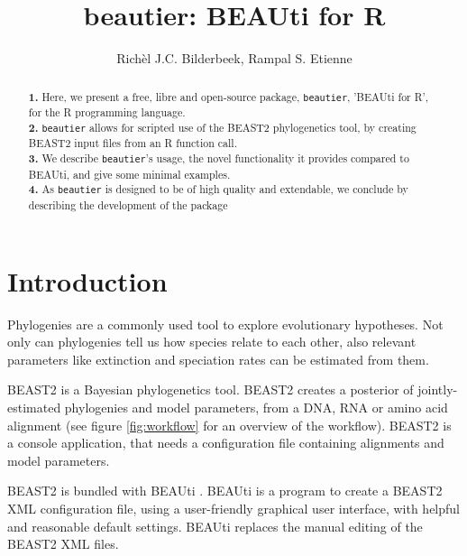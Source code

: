 \documentclass{article}
\title{beautier: BEAUti for R}
\author{Rich\`el J.C. Bilderbeek, Rampal S. Etienne}
\begin{document}
\maketitle

\begin{abstract}
  \textbf{1. }
    Here, we present a free, libre and open-source package, \verb;beautier;, 
    'BEAUti for R', for the R programming language. \\
  \textbf{2. }
    \verb;beautier; allows for scripted use of the BEAST2 phylogenetics tool, 
    by creating BEAST2 input files from an R function call. \\
  \textbf{3. }
    We describe \verb;beautier;'s usage, the novel functionality it provides
    compared to BEAUti, and give some minimal examples. \\
  \textbf{4. }
    As \verb;beautier; is designed to be of high quality and extendable, 
    we conclude by describing the development of the package \\
\end{abstract}


\section{Introduction}

Phylogenies are a commonly used tool to explore evolutionary hypotheses.
Not only can phylogenies tell us how species relate to each other, also relevant parameters like
extinction and speciation rates can be estimated from them.

BEAST2 \cite{bouckaert2014beast} is a Bayesian phylogenetics tool.
BEAST2 creates a posterior of jointly-estimated phylogenies and model
parameters, from a DNA, RNA or amino acid alignment (see figure \ref{fig:workflow} for an overview
of the workflow). BEAST2 is a 
console application, that needs a configuration file containing alignments and model parameters.

BEAST2 is bundled with BEAUti \cite{drummond2012bayesian}. 
BEAUti is a program to create a BEAST2 XML configuration file, 
using a user-friendly graphical user interface, with helpful and reasonable 
default settings. BEAUti replaces the manual editing of the BEAST2 XML
files. 
\end{document}
